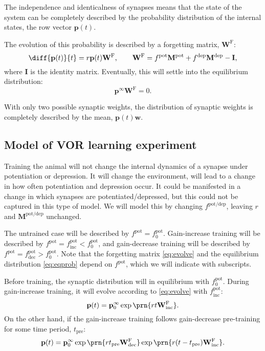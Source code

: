 \documentclass[12pt]{article}
\newcommand{\I}{\mathbf{I}}
\newcommand{\pr}{\mathbf{p}}
\newcommand{\eq}{\pr^\infty}
\newcommand{\w}{\mathbf{w}}
\newcommand{\W}{\mathbf{W}}
\newcommand{\frg}{\W^\mathrm{F}}
\newcommand{\M}{\mathbf{M}}
\newcommand{\pot}{^{\text{pot}}}
\newcommand{\dep}{^{\text{dep}}}
\newcommand{\potdep}{^{\text{pot/dep}}}
\newcommand{\norm}{_0}
\newcommand{\inc}{_{\text{inc}}}
\newcommand{\dec}{_{\text{dec}}}
\newcommand{\tpre}{t_{\text{pre}}}
\begin{document}
The independence and identicalness of synapses means that the state of the system can be completely described by the probability distribution of the internal states, the row vector $\pr(t)$.

The evolution of this probability is described by a forgetting matrix, $\frg$:
%
\begin{equation}\label{eq:evolve}
  \diff{\pr(t)}{t} = r\pr(t)\frg,
  \qquad
  \frg = f\pot\M\pot+f\dep\M\dep-\I,
\end{equation}
where $\I$ is the identity matrix.
%
Eventually, this will settle into the equilibrium distribution:
%
\begin{equation}\label{eq:eqprob}
  \eq\frg=0.
\end{equation}
%



With only two possible synaptic weights, the distribution of synaptic weights is completely described by the mean, $\pr(t)\w$.


\subsection{Model of VOR learning experiment}\label{sec:learning}

Training the animal will not change the internal dynamics of a synapse under potentiation or depression.
It will change the environment, will lead to a change in how often potentiation and depression occur.
It could be manifested in a change in which synapses are potentiated/depressed, but this could not be captured in this type of model.
We will model this by changing $f\potdep$, leaving $r$ and $\M\potdep$ unchanged.

The untrained case will be described by $f\pot=f\pot\norm$.
Gain-increase training  will be described by $f\pot=f\pot\inc<f\pot\norm$, and
gain-decrease training  will be described by $f\pot=f\pot\dec>f\pot\norm$. Note that the forgetting matrix \eqref{eq:evolve} and the equilibrium distribution \eqref{eq:eqprob} depend on $f\pot$, which we will indicate with subscripts.

Before training, the synaptic distribution will in equilibrium with $f\pot\norm$.
During gain-increase training, it will evolve according to \eqref{eq:evolve} with $f\pot\inc$:
%
\begin{equation}\label{eq:nopre}
  \pr(t) = \eq\norm \exp\prn{rt\frg\inc}.
\end{equation}
%
On the other hand, if the gain-increase training follows gain-decrease pre-training for some time period, $\tpre$:
%
\begin{equation}\label{eq:withpre}
  \pr(t) = \eq\norm \exp\prn{r\tpre\frg\dec} \exp\prn{r(t-\tpre)\frg\inc}.
\end{equation}
%
\end{document}

